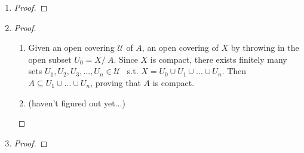 \documentclass[paper=a4, fontsize=11pt]{scrartcl} %
\numberwithin{equation}{section} %
\numberwithin{figure}{section} %
\numberwithin{table}{section} %
\begin{document}
\begin{enumerate}
	\item
		\begin{proof}
			
		\end{proof}

	\item
		\begin{proof}
			\begin{enumerate}
				\item
					Given an open covering $\mathscr{U}$ of $A$, an open covering of $X$ by throwing in the open subset $U_0 = X /\ A$. Since $X$ is compact, there exists finitely many sets $U_1, U_2, U_3, ... , U_n \in \mathscr{U}$ \ s.t. $X = U_0 \cup U_1 \cup ... \cup U_n$. Then $A \subseteq  U_1 \cup ... \cup U_n$, proving that $A$ is compact.
				\item
					(haven't figured out yet...)
			\end{enumerate}
		\end{proof}
	
	\item
		\begin{proof}
			
		\end{proof}
\end{enumerate}

\end{document}

